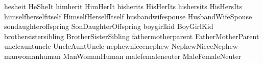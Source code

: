 \pronoun{\they}		{he}{she}{it}
\pronoun{\They}		{He}{She}{It}
\pronoun{\them}		{him}{her}{it}
\pronoun{\Them}		{Him}{Her}{It}
\pronoun{\their}	{his}{her}{its}
\pronoun{\Their}	{His}{Her}{Its}
\pronoun{\theirs}	{his}{hers}{its}
\pronoun{\Theirs}	{His}{Hers}{Its}
\pronoun{\themself}	{himself}{herself}{itself}
\pronoun{\Themself}	{Himself}{Herself}{Itself}
\pronoun{\spouse}	{husband}{wife}{spouse}
\pronoun{\Spouse}	{Husband}{Wife}{Spouse}
\pronoun{\offspring}	{son}{daughter}{offspring}
\pronoun{\Offspring}	{Son}{Daughter}{Offspring}
\pronoun{\kid}		{boy}{girl}{kid}
\pronoun{\Kid}		{Boy}{Girl}{Kid}
\pronoun{\sibling}	{brother}{sister}{sibling}
\pronoun{\Sibling}	{Brother}{Sister}{Sibling}
\pronoun{\parent}	{father}{mother}{parent}
\pronoun{\Parent}	{Father}{Mother}{Parent}
\pronoun{\uncle}	{uncle}{aunt}{uncle}
\pronoun{\Uncle}	{Uncle}{Aunt}{Uncle}
\pronoun{\nephew}	{nephew}{niece}{nephew}
\pronoun{\Nephew}	{Nephew}{Niece}{Nephew}
\def\aunt{\uncle}
\def\Aunt{\Uncle}
\def\niece{\nephew}
\def\Niece{\Nephew}
\pronoun{\human}	{man}{woman}{human}
\pronoun{\Human}	{Man}{Woman}{Human}
\pronoun{\sex}		{male}{female}{neuter}
\pronoun{\Sex}		{Male}{Female}{Neuter}











